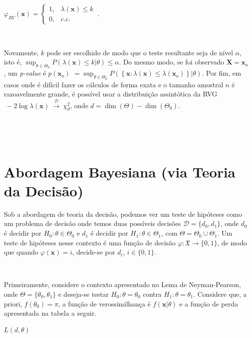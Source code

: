 \documentclass[
]{book}
\begin{document}
\({\varphi}_{RV}(\boldsymbol x)=\left\{\begin{array}{rl} 1,& \lambda(\boldsymbol x) \leq k\\ 0,& c.c.\end{array}\right.~.\)

\(~\)

Novamente, \(k\) pode ser escolhido de modo que o teste resultante seja de nível \(\alpha\), isto é, \(\displaystyle \sup_{\theta \in \Theta_0} P\left(\lambda(\boldsymbol x) \leq k \Big | \theta\right) \leq \alpha\). Do mesmo modo, se foi observado \(\boldsymbol X=\boldsymbol x_o\), um \emph{p-value} é \(p(\boldsymbol x_o)\) \(=\displaystyle \sup_{\theta \in \Theta_0}P\left(\left\{\boldsymbol x: \lambda(\boldsymbol x) \leq \lambda(\boldsymbol x_o)\right\}\big|\theta\right)\). Por fim, em casos onde é difícil fazer os cálculos de forma exata e o tamanho amostral \(n\) é razoavelmente grande, é possível usar a distribuição assintótica da RVG \(~-2\log \lambda(\boldsymbol x)\overset{\mathcal{D}}{~\longrightarrow~}\chi_d^2\), onde \(d=\dim(\Theta)-\dim(\Theta_0)\).

\(~\)

\(~\)

\hypertarget{abordagem-bayesiana-via-teoria-da-decisuxe3o}{%
\section{Abordagem Bayesiana (via Teoria da Decisão)}\label{abordagem-bayesiana-via-teoria-da-decisuxe3o}}

Sob a abordagem de teoria da decisão, podemos ver um teste de hipóteses como um problema de decisão onde temos duas possíveis decisões \(\mathcal{D}=\{d_0,d_1\}\), onde \(d_0\) é decidir por \(H_0:\theta \in \Theta_0\) e \(d_1\) é decidir por \(H_1:\theta \in \Theta_1\), com \(\Theta=\Theta_0\cup\Theta_1\). Um teste de hipóteses nesse contexto é uma função de decisão \(\varphi: \mathfrak{X} \longrightarrow \{0,1\}\), de modo que quando \(\varphi(\boldsymbol x)=i\), decide-se por \(d_i\), \(i\in \{0,1\}\).

\(~\)

Primeiramente, considere o contexto apresentado no Lema de Neyman-Pearson, onde \(\Theta=\{\theta_0,\theta_1\}\) e deseja-se testar \(H_0: \theta=\theta_0\) contra \(H_1: \theta = \theta_1\). Considere que, a priori, \(f(\theta_0) = \pi\), a função de verossimilhança é \(f(\boldsymbol x |\theta)\) e a função de perda apresentada na tabela a seguir.

\(L(d,\theta)\)
\end{document}
